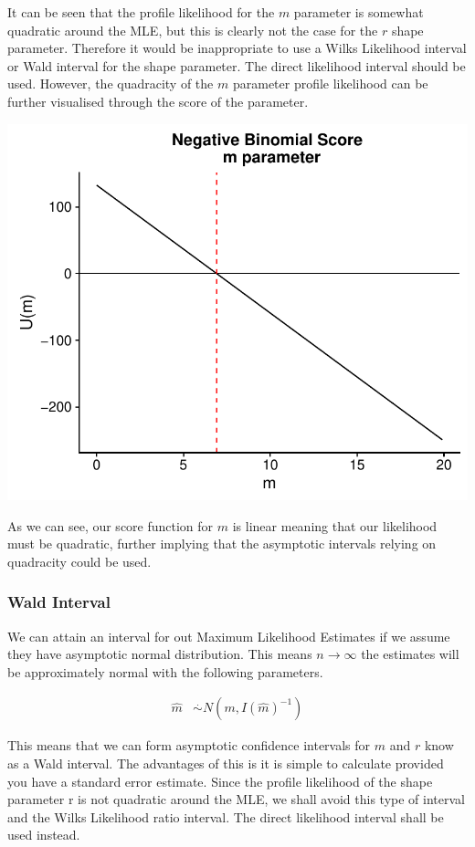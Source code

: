 \documentclass[11pt,preprint, authoryear]{elsarticle}
\numberwithin{equation}{section}
\numberwithin{figure}{section}
\numberwithin{table}{section}
\begin{document}
It can be seen that the profile likelihood for the \(m\) parameter is
somewhat quadratic around the MLE, but this is clearly not the case for
the \(r\) shape parameter. Therefore it would be inappropriate to use a
Wilks Likelihood interval or Wald interval for the shape parameter. The
direct likelihood interval should be used. However, the quadracity of
the \(m\) parameter profile likelihood can be further visualised through
the score of the parameter.

\includegraphics{likelihood_files/figure-latex/unnamed-chunk-5-1.pdf}

As we can see, our score function for \(m\) is linear meaning that our
likelihood must be quadratic, further implying that the asymptotic
intervals relying on quadracity could be used.

\subsubsection{Wald Interval}\label{wald-interval}

We can attain an interval for out Maximum Likelihood Estimates if we
assume they have asymptotic normal distribution. This means
\(n\to\infty\) the estimates will be approximately normal with the
following parameters.

\begin{align*}
\hat{m} & \stackrel{.}{\sim} N(m,I(\hat{m})^{-1})
\end{align*}

This means that we can form asymptotic confidence intervals for \(m\)
and \(r\) know as a Wald interval. The advantages of this is it is
simple to calculate provided you have a standard error estimate. Since
the profile likelihood of the shape parameter r is not quadratic around
the MLE, we shall avoid this type of interval and the Wilks Likelihood
ratio interval. The direct likelihood interval shall be used instead.
\end{document}
